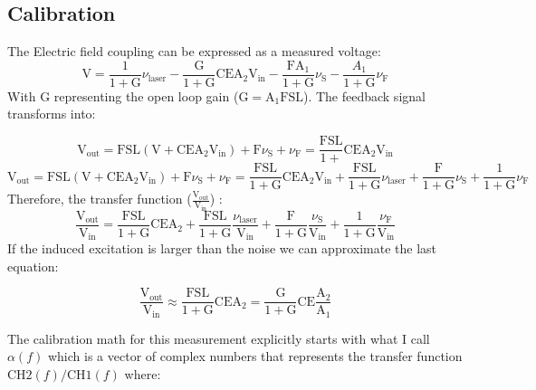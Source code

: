 \subsection{Calibration}

The Electric field coupling can be expressed as a measured voltage:
$$\mathrm{V} = \frac{1}{1 + \mathrm{G}} \nu_\mathrm{laser} - \frac{\mathrm{G}}{1 + \mathrm{G}} \mathrm{C} \mathrm{E} \mathrm{A}_{2} \mathrm{V}_\mathrm{in} - \frac{\mathrm{F} \mathrm{A}_1}{1 + \mathrm{G}} \nu_\mathrm{S} - \frac{A_1}{1 + \mathrm{G}} \nu_\mathrm{F}$$
With G representing the open loop gain ($\mathrm{G} = \mathrm{A}_1 \mathrm{F} \mathrm{S} \mathrm{L}$). The feedback signal transforms into:

$$ \mathrm{V}_\mathrm{out} = \mathrm{F} \mathrm{S} \mathrm{L} (\mathrm{V} + \mathrm{C} \mathrm{E} \mathrm{A}_{2} \mathrm{V}_\mathrm{in}) + \mathrm{F} \nu_\mathrm{S} + \nu_\mathrm{F} = \frac{\mathrm{F} \mathrm{S} \mathrm{L}}{1 + } \mathrm{C} \mathrm{E} \mathrm{A}_{2} \mathrm{V}_\mathrm{in}
$$
$$ \mathrm{V}_\mathrm{out} = \mathrm{F} \mathrm{S} \mathrm{L} (\mathrm{V} + \mathrm{C} \mathrm{E} \mathrm{A}_{2} \mathrm{V}_\mathrm{in}) + \mathrm{F} \nu_\mathrm{S} + \nu_\mathrm{F} = \frac{\mathrm{F} \mathrm{S} \mathrm{L}}{ 1 + \mathrm{G}} \mathrm{C} \mathrm{E} \mathrm{A}_{2} \mathrm{V}_\mathrm{in} + \frac{\mathrm{F} \mathrm{S} \mathrm{L}}{ 1 + \mathrm{G}} \nu_\mathrm{laser} + \frac{\mathrm{F} }{ 1 + \mathrm{G}} \nu_\mathrm{S} +  \frac{1}{ 1 + \mathrm{G}} \nu_\mathrm{F}$$ 
Therefore, the transfer function ($\frac{\mathrm{V}_\mathrm{out}}{\mathrm{V}_\mathrm{in}}$) : 
$$ \frac{\mathrm{V}_\mathrm{out}}{\mathrm{V}_\mathrm{in}} = \frac{\mathrm{F} \mathrm{S} \mathrm{L}}{1 + \mathrm{G}}\mathrm{C} \mathrm{E} \mathrm{A}_{2}  + \frac{\mathrm{F} \mathrm{S} \mathrm{L}}{ 1 + \mathrm{G}} \frac{\nu_\mathrm{laser}}{\mathrm{V}_\mathrm{in}}+ \frac{\mathrm{F} }{ 1 + \mathrm{G}} \frac{\nu_\mathrm{S}}{\mathrm{V}_\mathrm{in}} +  \frac{1}{ 1 + \mathrm{G}} \frac{\nu_\mathrm{F}}{\mathrm{V}_\mathrm{in}}$$
If the induced excitation is larger than the noise we can approximate the last equation:

$$ \frac{\mathrm{V}_\mathrm{out}}{\mathrm{V_{in}}} \approx \frac{\mathrm{F} \mathrm{S}\mathrm{L}}{1 + \mathrm{G}} \mathrm{C} \mathrm{E} \mathrm{A}_{2} = \frac{\mathrm{G}}{1 + \mathrm{G}} \mathrm{C} \mathrm{E} \frac{\mathrm{A}_{2}}{\mathrm{A}_{1}} $$
 

\iffalse
The calibration math for this measurement explicitly starts with what I
call \(\alpha(f)\) which is a vector of complex numbers that represents
the transfer function \(\mathrm{CH2}(f)/\mathrm{CH1}(f)\) where:

